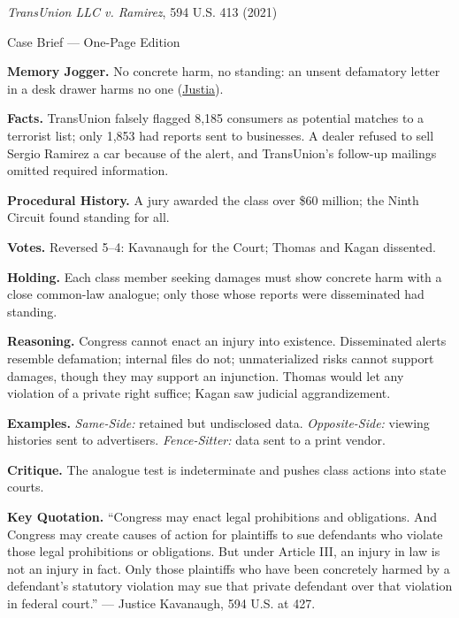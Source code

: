 \documentclass[12pt]{article}
\begin{document}
\begin{center}
{\Large \textit{TransUnion LLC v. Ramirez}, 594 U.S. 413 (2021)\par}
\vspace{0.3em}
{\normalsize Case Brief --- One-Page Edition\par}
\end{center}

\textbf{Memory Jogger.} No concrete harm, no standing: an unsent defamatory letter in a desk drawer harms no one (\href{https://supreme.justia.com/cases/federal/us/594/20-297/}{Justia}).

\textbf{Facts.} TransUnion falsely flagged 8,185 consumers as potential matches to a terrorist list; only 1,853 had reports sent to businesses. A dealer refused to sell Sergio Ramirez a car because of the alert, and TransUnion's follow-up mailings omitted required information.

\textbf{Procedural History.} A jury awarded the class over \$60 million; the Ninth Circuit found standing for all.

\textbf{Votes.} Reversed 5--4: Kavanaugh for the Court; Thomas and Kagan dissented.

\textbf{Holding.} Each class member seeking damages must show concrete harm with a close common-law analogue; only those whose reports were disseminated had standing.

\textbf{Reasoning.} Congress cannot enact an injury into existence. Disseminated alerts resemble defamation; internal files do not; unmaterialized risks cannot support damages, though they may support an injunction. Thomas would let any violation of a private right suffice; Kagan saw judicial aggrandizement.

\textbf{Examples.} \emph{Same-Side:} retained but undisclosed data. \emph{Opposite-Side:} viewing histories sent to advertisers. \emph{Fence-Sitter:} data sent to a print vendor.

\textbf{Critique.} The analogue test is indeterminate and pushes class actions into state courts.

\textbf{Key Quotation.} ``Congress may enact legal prohibitions and obligations. And Congress may create causes of action for plaintiffs to sue defendants who violate those legal prohibitions or obligations. But under Article III, an injury in law is not an injury in fact. Only those plaintiffs who have been concretely harmed by a defendant's statutory violation may sue that private defendant over that violation in federal court.'' --- Justice Kavanaugh, 594 U.S. at 427.
\end{document}
